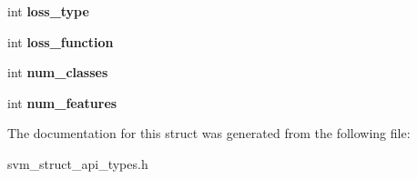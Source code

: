 \begin{DoxyCompactItemize}
\item 
\hypertarget{structstruct__learn__parm_a30504a3cac4568391a3ae73a21f1f5c3}{}int {\bfseries loss\+\_\+type}\label{structstruct__learn__parm_a30504a3cac4568391a3ae73a21f1f5c3}

\item 
\hypertarget{structstruct__learn__parm_abcdf4e08d8059532f4fc393edc4d4ace}{}int {\bfseries loss\+\_\+function}\label{structstruct__learn__parm_abcdf4e08d8059532f4fc393edc4d4ace}

\item 
\hypertarget{structstruct__learn__parm_a350f2d06d0051b5aa8f99434ab8b4838}{}int {\bfseries num\+\_\+classes}\label{structstruct__learn__parm_a350f2d06d0051b5aa8f99434ab8b4838}

\item 
\hypertarget{structstruct__learn__parm_a5b0eb96bc2dbd76a66af80584201ee3e}{}int {\bfseries num\+\_\+features}\label{structstruct__learn__parm_a5b0eb96bc2dbd76a66af80584201ee3e}

\end{DoxyCompactItemize}


The documentation for this struct was generated from the following file\+:\begin{DoxyCompactItemize}
\item 
svm\+\_\+struct\+\_\+api\+\_\+types.\+h\end{DoxyCompactItemize}
